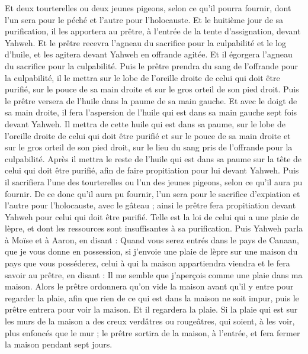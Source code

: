 \begin{multicols}{2}
Et deux tourterelles ou deux jeunes pigeons, selon ce qu'il pourra fournir, dont l'un sera pour le péché et l'autre pour l'holocauste.
Et le huitième jour de sa purification, il les apportera au prêtre, à l'entrée de la tente d'assignation, devant Yahweh.
Et le prêtre recevra l'agneau du sacrifice pour la culpabilité et le log d'huile, et les agitera devant Yahweh en offrande agitée.
Et il égorgera l'agneau du sacrifice pour la culpabilité. Puis le prêtre prendra du sang de l'offrande pour la culpabilité, il le mettra sur le lobe de l'oreille droite de celui qui doit être purifié, sur le pouce de sa main droite et sur le gros orteil de son pied droit.
Puis le prêtre versera de l'huile dans la paume de sa main gauche.
Et avec le doigt de sa main droite, il fera l'aspersion de l'huile qui est dans sa main gauche sept fois devant Yahweh.
Il mettra de cette huile qui est dans sa paume, sur le lobe de l'oreille droite de celui qui doit être purifié et sur le pouce de sa main droite et sur le gros orteil de son pied droit, sur le lieu du sang pris de l'offrande pour la culpabilité.
Après il mettra le reste de l'huile qui est dans sa paume sur la tête de celui qui doit être purifié, afin de faire propitiation pour lui devant Yahweh.
Puis il sacrifiera l'une des tourterelles ou l'un des jeunes pigeons, selon ce qu'il aura pu fournir.
De ce donc qu'il aura pu fournir, l'un sera pour le sacrifice d'expiation et l'autre pour l'holocauste, avec le gâteau ; ainsi le prêtre fera propitiation devant Yahweh pour celui qui doit être purifié.
Telle est la loi de celui qui a une plaie de lèpre, et dont les ressources sont insuffisantes à sa purification.
Puis Yahweh parla à Moïse et à Aaron, en disant :
Quand vous serez entrés dans le pays de Canaan, que je vous donne en possession, si j'envoie une plaie de lèpre sur une maison du pays que vous posséderez,
celui à qui la maison appartiendra viendra et le fera savoir au prêtre, en disant : Il me semble que j'aperçois comme une plaie dans ma maison.
Alors le prêtre ordonnera qu'on vide la maison avant qu'il y entre pour regarder la plaie, afin que rien de ce qui est dans la maison ne soit impur, puis le prêtre entrera pour voir la maison.
Et il regardera la plaie. Si la plaie qui est sur les murs de la maison a des creux verdâtres ou rougeâtres, qui soient, à les voir, plus enfoncés que le mur ;
le prêtre sortira de la maison, à l'entrée, et fera fermer la maison pendant sept jours.

\end{multicols}
